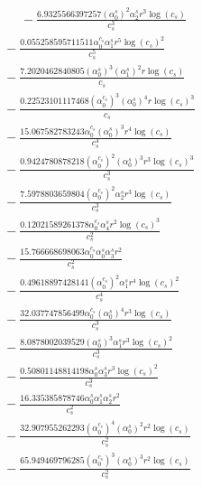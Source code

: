 \documentclass[10pt]{article}
\begin{document}
\begin{align*}
\phantom{R_{3,8}} &\phantom{={}}{}  - \frac{6.9325566397257 \left(\alpha_{0}^s\right)^{2} \alpha_{2}^s r^{3} \log{\left(c_{s} \right)}}{c_{s}^{3}} \\
&{}  - \frac{0.055258595711511 \alpha_{0}^{c_s} \alpha_{1}^s r^{5} \log{\left(c_{s} \right)}^{2}}{c_{s}^{5}} \\
&{}  - \frac{7.2020462840805 \left(\alpha_{0}^s\right)^{3} \left(\alpha_{1}^s\right)^{2} r \log{\left(c_{s} \right)}}{c_{s}} \\
&{}  - \frac{0.22523101117468 \left(\alpha_{0}^{c_s}\right)^{3} \left(\alpha_{0}^s\right)^{4} r \log{\left(c_{s} \right)}^{3}}{c_{s}} \\
&{}  - \frac{15.067582783243 \alpha_{0}^{c_s} \left(\alpha_{0}^s\right)^{3} r^{4} \log{\left(c_{s} \right)}}{c_{s}^{4}} \\
&{}  - \frac{0.9424780878218 \left(\alpha_{0}^{c_s}\right)^{2} \left(\alpha_{0}^s\right)^{3} r^{3} \log{\left(c_{s} \right)}^{3}}{c_{s}^{3}} \\
&{}  - \frac{7.5978803659804 \left(\alpha_{0}^{c_s}\right)^{2} \alpha_{2}^s r^{3} \log{\left(c_{s} \right)}}{c_{s}^{3}} \\
&{}  - \frac{0.12021589261378 \alpha_{0}^{c_s} \alpha_{4}^s r^{2} \log{\left(c_{s} \right)}^{3}}{c_{s}^{2}} \\
&{}  - \frac{15.766668698063 \alpha_{0}^{c_s} \alpha_{0}^s \alpha_{3}^s r^{2}}{c_{s}^{2}} \\
&{}  - \frac{0.49618897428141 \left(\alpha_{0}^{c_s}\right)^{2} \alpha_{1}^s r^{4} \log{\left(c_{s} \right)}^{2}}{c_{s}^{4}} \\
&{}  - \frac{32.037747856499 \alpha_{0}^{c_s} \left(\alpha_{0}^s\right)^{4} r^{3} \log{\left(c_{s} \right)}}{c_{s}^{3}} \\
&{}  - \frac{8.0878002039529 \left(\alpha_{0}^s\right)^{3} \alpha_{1}^s r^{3} \log{\left(c_{s} \right)}^{2}}{c_{s}^{3}} \\
&{}  - \frac{0.50801148814198 \alpha_{0}^s \alpha_{3}^s r^{3} \log{\left(c_{s} \right)}^{2}}{c_{s}^{3}} \\
&{}  - \frac{16.335385878746 \alpha_{0}^s \alpha_{1}^s \alpha_{2}^s r^{2}}{c_{s}^{2}} \\
&{}  - \frac{32.907955262293 \left(\alpha_{0}^{c_s}\right)^{4} \left(\alpha_{0}^s\right)^{2} r^{2} \log{\left(c_{s} \right)}}{c_{s}^{2}} \\
&{}  - \frac{65.949469796285 \left(\alpha_{0}^{c_s}\right)^{3} \left(\alpha_{0}^s\right)^{3} r^{2} \log{\left(c_{s} \right)}}{c_{s}^{2}} \\

\end{align*}
\end{document}
